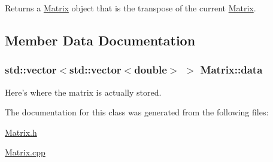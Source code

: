 Returns a \hyperlink{class_matrix}{Matrix} object that is the transpose of the current \hyperlink{class_matrix}{Matrix}. 



\subsection{Member Data Documentation}
\hypertarget{class_matrix_dab4557133e13b08ae470a8e5df7b99c}{
\subsubsection[{data}]{\setlength{\rightskip}{0pt plus 5cm}std::vector$<$std::vector$<$double$>$ $>$ {\bf Matrix::data}}}
\label{class_matrix_dab4557133e13b08ae470a8e5df7b99c}


Here's where the matrix is actually stored. 



The documentation for this class was generated from the following files:\begin{CompactItemize}
\item 
\hyperlink{_matrix_8h}{Matrix.h}\item 
\hyperlink{_matrix_8cpp}{Matrix.cpp}\end{CompactItemize}
